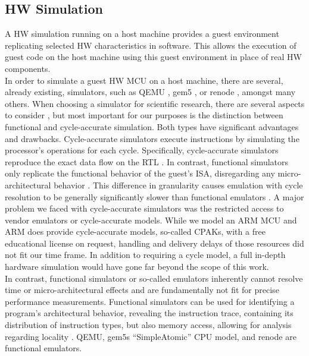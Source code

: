 \documentclass[english]{tudscrartcl}
\begin{document}
		\subsection{\ac{HW} Simulation}
			\label{sec:bg_hwsim}
			A \ac{HW} simulation running on a host machine provides a guest environment replicating selected \ac{HW} characteristics in software.
			This allows the execution of guest code on the host machine using this guest environment in place of real \ac{HW} components.
			\\
			In order to simulate a guest \ac{HW} \ac{MCU} on a host machine, there are several, already existing, simulators, such as QEMU \cite{QEMU-WebSite}, gem5 \cite{gem5-WebSite}, or renode \cite{renode-WebSite}, amongst many others.
			When choosing a simulator for scientific research, there are several aspects to consider \cite{8718630}, but most important for our purposes is the distinction between functional and cycle-accurate simulation.
			Both types have significant advantages and drawbacks.
			Cycle-accurate simulators execute instructions by simulating the processor's operations for each cycle.
			Specifically, cycle-accurate simulators reproduce the exact data flow on the \ac{RTL} \cite{8718630}.
			In contrast, functional simulators only replicate the functional behavior of the guest's \ac{ISA}, disregarding any micro-architectural behavior \cite{8718630}.
			This difference in granularity causes emulation with cycle resolution to be generally significantly slower than functional emulators \cite{8718630}.
			A major problem we faced with cycle-accurate simulators was the restricted access to vendor emulators or cycle-accurate models.
			While we model an ARM \ac{MCU} and ARM does provide cycle-accurate models, so-called CPAKs, with a free educational license on request, handling and delivery delays of those resources did not fit our time frame.
			In addition to requiring a cycle model, a full in-depth hardware simulation would have gone far beyond the scope of this work.
			\\
			In contrast, functional simulators or so-called emulators inherently cannot resolve time or micro-architectural effects and are fundamentally not fit for precise performance measurements.
			Functional simulators can be used for identifying a program's architectural behavior, revealing the instruction trace, containing its distribution of instruction types, but also memory access, allowing for analysis regarding locality \cite{8718630}.
			QEMU, gem5s ``SimpleAtomic'' \ac{CPU} model, and renode are functional emulators.
\end{document}
